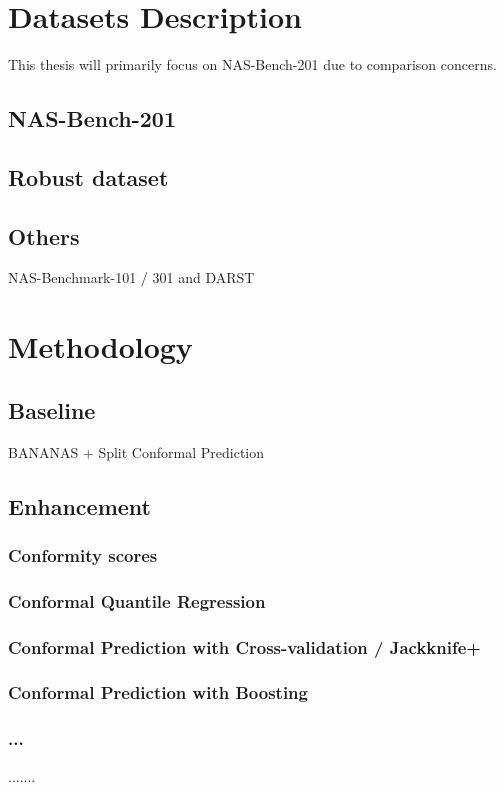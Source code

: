 \documentclass[a4paper,oneside,bibliography=totoc]{scrbook}
\begin{document}
\chapter{Datasets Description}
\label{Dataset}

This thesis will primarily focus on NAS-Bench-201 due to comparison concerns.
\section{NAS-Bench-201}
\section{Robust dataset}
\section{Others} NAS-Benchmark-101 / 301 and DARST


\chapter{Methodology}
\label{Method}

\section{Baseline}
BANANAS + Split Conformal Prediction

\section{Enhancement}
\subsection{Conformity scores}
\subsection{Conformal Quantile Regression}
\subsection{Conformal Prediction with Cross-validation / Jackknife+}
\subsection{Conformal Prediction with Boosting}
\subsection{...}
.......
\end{document}
